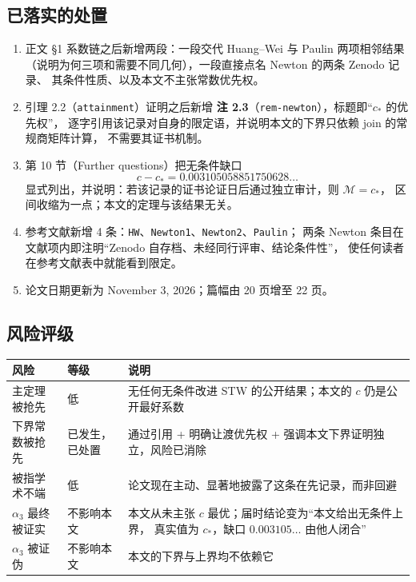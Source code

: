 \documentclass[UTF8,11pt]{ctexart}
\newcommand{\cst}{c_\ast}
\begin{document}
\subsection{已落实的处置}

\begin{enumerate}[label=(\roman*),leftmargin=2.2em]
\item 正文 §1 系数链之后新增两段：一段交代 Huang--Wei 与 Paulin 两项相邻结果
（说明为何三项和需要不同几何），一段直接点名 Newton 的两条 Zenodo 记录、
其条件性质、以及本文不主张常数优先权。
\item 引理 2.2（\texttt{attainment}）证明之后新增
\textbf{注 2.3}（\texttt{rem-newton}），标题即``$\cst$ 的优先权''，
逐字引用该记录对自身的限定语，并说明本文的下界只依赖 join 的常规商矩阵计算，
不需要其证书机制。
\item 第 10 节（Further questions）把无条件缺口
\[
 c-\cst=0.003105058851750628\ldots
\]
显式列出，并说明：若该记录的证书论证日后通过独立审计，则 $\mathcal M=\cst$，
区间收缩为一点；本文的定理与该结果无关。
\item 参考文献新增 4 条：\texttt{HW}、\texttt{Newton1}、\texttt{Newton2}、\texttt{Paulin}；
两条 Newton 条目在文献项内即注明``Zenodo 自存档、未经同行评审、结论条件性''，
使任何读者在参考文献表中就能看到限定。
\item 论文日期更新为 November 3, 2026；篇幅由 20 页增至 22 页。
\end{enumerate}

\subsection{风险评级}

\begin{center}\small
\begin{tabular}{@{}p{4.2cm}p{2.0cm}p{8.6cm}@{}}
\toprule
风险 & 等级 & 说明\\
\midrule
主定理被抢先 & \textcolor[rgb]{0.05,0.45,0.15}{低} &
无任何无条件改进 STW 的公开结果；本文的 $c$ 仍是公开最好系数\\
下界常数被抢先 & \textcolor[rgb]{0.72,0.28,0.02}{已发生，已处置} &
通过引用 + 明确让渡优先权 + 强调本文下界证明独立，风险已消除\\
被指学术不端 & \textcolor[rgb]{0.05,0.45,0.15}{低} &
论文现在主动、显著地披露了这条在先记录，而非回避\\
$\alpha_3$ 最终被证实 & \textcolor[rgb]{0.05,0.25,0.55}{不影响本文} &
本文从未主张 $c$ 最优；届时结论变为``本文给出无条件上界，
真实值为 $\cst$，缺口 $0.003105\ldots$ 由他人闭合''\\
$\alpha_3$ 被证伪 & \textcolor[rgb]{0.05,0.45,0.15}{不影响本文} &
本文的下界与上界均不依赖它\\
\bottomrule
\end{tabular}
\end{center}
\end{document}

